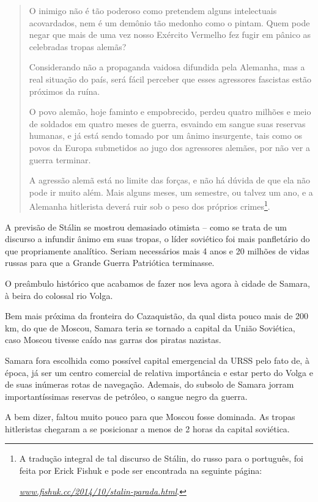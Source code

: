 \begin{quote}
O inimigo não é tão poderoso como pretendem alguns intelectuais
acovardados, nem é um demônio tão medonho como o pintam. Quem pode negar
que mais de uma vez nosso Exército Vermelho fez fugir em pânico as
celebradas tropas alemãs?

Considerando não a propaganda vaidosa difundida pela Alemanha, mas a
real situação do país, será fácil perceber que esses agressores
fascistas estão próximos da ruína.

O povo alemão, hoje faminto e empobrecido, perdeu quatro milhões e meio
de soldados em quatro meses de guerra, esvaindo em sangue suas reservas
humanas, e já está sendo tomado por um ânimo insurgente, tais como os
povos da Europa submetidos ao jugo dos agressores alemães, por não ver a
guerra terminar.

A agressão alemã está no limite das forças, e não há dúvida de que ela
não pode ir muito além. Mais alguns meses, um semestre, ou talvez um
ano, e a Alemanha hitlerista deverá ruir sob o peso dos próprios
crimes\footnote{A tradução integral de tal discurso de Stálin, do russo
  para o português, foi feita por Erick Fishuk e pode ser encontrada na
  seguinte página:

  \href{http://www.fishuk.cc/2014/10/stalin-parada.html}{\emph{www.fishuk.cc/2014/10/stalin-parada.html}}.}.
\end{quote}

A previsão de Stálin se mostrou demasiado otimista -- como se trata de
um discurso a infundir ânimo em suas tropas, o líder soviético foi mais
panfletário do que propriamente analítico. Seriam necessários mais 4
anos e 20 milhões de vidas russas para que a Grande Guerra Patriótica
terminasse.

O preâmbulo histórico que acabamos de fazer nos leva agora à cidade de
Samara, à beira do colossal rio Volga.

Bem mais próxima da fronteira do Cazaquistão, da qual dista pouco mais
de 200 km, do que de Moscou, Samara teria se tornado a capital da União
Soviética, caso Moscou tivesse caído nas garras dos piratas nazistas.

Samara fora escolhida como possível capital emergencial da URSS pelo
fato de, à época, já ser um centro comercial de relativa importância e
estar perto do Volga e de suas inúmeras rotas de navegação. Ademais, do
subsolo de Samara jorram importantíssimas reservas de petróleo, o sangue
negro da guerra.

A bem dizer, faltou muito pouco para que Moscou fosse dominada. As
tropas hitleristas chegaram a se posicionar a menos de 2 horas da
capital soviética.

